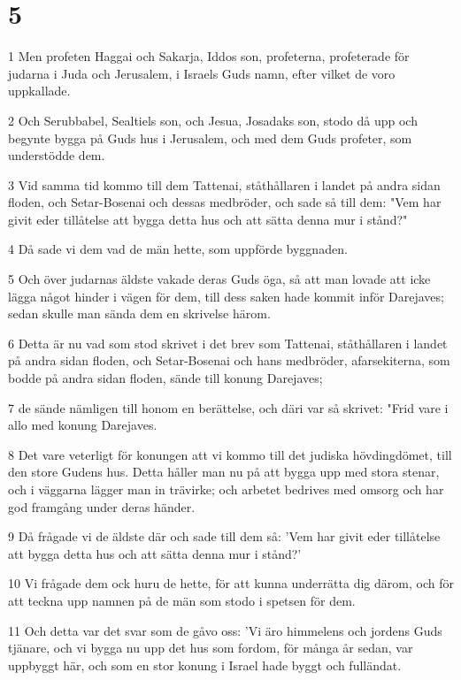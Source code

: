 \chapter{5}

\par 1 Men profeten Haggai och Sakarja, Iddos son, profeterna, profeterade för judarna i Juda och Jerusalem, i Israels Guds namn, efter vilket de voro uppkallade.
\par 2 Och Serubbabel, Sealtiels son, och Jesua, Josadaks son, stodo då upp och begynte bygga på Guds hus i Jerusalem, och med dem Guds profeter, som understödde dem.
\par 3 Vid samma tid kommo till dem Tattenai, ståthållaren i landet på andra sidan floden, och Setar-Bosenai och dessas medbröder, och sade så till dem: "Vem har givit eder tillåtelse att bygga detta hus och att sätta denna mur i stånd?"
\par 4 Då sade vi dem vad de män hette, som uppförde byggnaden.
\par 5 Och över judarnas äldste vakade deras Guds öga, så att man lovade att icke lägga något hinder i vägen för dem, till dess saken hade kommit inför Darejaves; sedan skulle man sända dem en skrivelse härom.
\par 6 Detta är nu vad som stod skrivet i det brev som Tattenai, ståthållaren i landet på andra sidan floden, och Setar-Bosenai och hans medbröder, afarsekiterna, som bodde på andra sidan floden, sände till konung Darejaves;
\par 7 de sände nämligen till honom en berättelse, och däri var så skrivet: "Frid vare i allo med konung Darejaves.
\par 8 Det vare veterligt för konungen att vi kommo till det judiska hövdingdömet, till den store Gudens hus. Detta håller man nu på att bygga upp med stora stenar, och i väggarna lägger man in trävirke; och arbetet bedrives med omsorg och har god framgång under deras händer.
\par 9 Då frågade vi de äldste där och sade till dem så: 'Vem har givit eder tillåtelse att bygga detta hus och att sätta denna mur i stånd?'
\par 10 Vi frågade dem ock huru de hette, för att kunna underrätta dig därom, och för att teckna upp namnen på de män som stodo i spetsen för dem.
\par 11 Och detta var det svar som de gåvo oss: 'Vi äro himmelens och jordens Guds tjänare, och vi bygga nu upp det hus som fordom, för många år sedan, var uppbyggt här, och som en stor konung i Israel hade byggt och fulländat.
